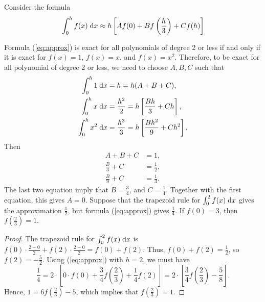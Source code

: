 \documentclass{homework}
\begin{document}
	\maketitle
	
	\question
	Consider the formula
	\begin{equation}
		\label{eq:approx}
		\int_0^h f(x)\;\text{d} x \approx h\left[Af(0) + Bf\left(\frac{h}{3}\right) + Cf(h)\right]
	\end{equation}
	\begin{alphaparts}
		\questionpart
		Formula (\ref{eq:approx}) is exact for all polynomials of degree 2 or less if and only if it is exact for $f(x) = 1$, $f(x) = x$, and $f(x) = x^2$. Therefore, to be exact for all polynomial of degree 2 or less, we need to choose $A,B,C$ such that
		\begin{align}
			\int_0^h1\;\text{d} x &= h = h(A + B + C), \\
			\int_0^hx\;\text{d} x &= \frac{h^2}{2} = h\left[\frac{Bh}{3} + Ch\right], \\
			\int_0^hx^2\;\text{d} x &= \frac{h^3}{3} = h\left[\frac{Bh^2}{9} + Ch^2\right].
		\end{align}
		Then
		\begin{align}
			A + B + C &= 1, \\
			\frac{B}{3} + C &= \frac{1}{2}, \\
			\frac{B}{9} + C &= \frac{1}{3}.
		\end{align}
		The last two equation imply that $B = \frac{3}{4}$, and $C = \frac{1}{4}$. Together with the first equation, this gives $A = 0$.
		\questionpart Suppose that the trapezoid rule for $\int_0^2f(x)\;\text{d} x$ gives the approximation $\frac{1}{2}$, but formula (\ref{eq:approx}) gives $\frac{1}{4}$. If $f(0) = 3$, then $f\left(\frac{2}{3}\right) = 1$.
		\begin{proof}
			The trapezoid rule for $\int_0^2f(x)\;\text{d} x$ is $f(0)\cdot\frac{2-0}{2} + f(2)\cdot\frac{2-0}{2} = f(0) + f(2)$. Thus, $f(0) + f(2) = \frac{1}{2}$, so $f(2) = -\frac{5}{2}$. Using (\ref{eq:approx}) with $h = 2$, we must have
			\begin{equation}
				\frac{1}{4} = 2\cdot\left[0\cdot f(0) + \frac{3}{4}f\left(\frac{2}{3}\right) +\frac{1}{4}f(2)\right] = 2\cdot\left[\frac{3}{4}f\left(\frac{2}{3}\right) - \frac{5}{8}\right].
			\end{equation}
			Hence, $1 = 6f\left(\frac{2}{3}\right) - 5$, which implies that $f\left(\frac{2}{3}\right) =1$.
		\end{proof}
	\end{alphaparts}
	
\end{document}
